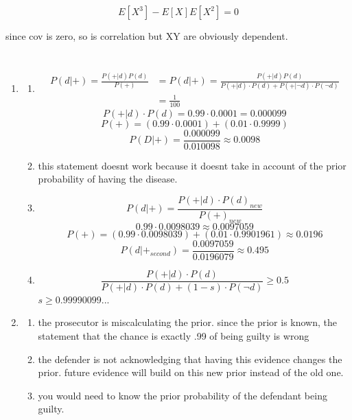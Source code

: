 \documentclass{article}
\begin{document}
\begin{enumerate}
    \begin{equation}
        E[X^3]-E[X]E[X^2]=0
    \end{equation}

    since cov is zero, so is correlation but XY are obviously dependent. 
\end{enumerate}

\section{}
\begin{enumerate}
    \item \begin{enumerate}
        \item \begin{equation}\begin{split}
                P(d|+)=\frac{P(+|d)P(d)}{P(+)} &= 
                P(d|+)=\frac{P(+|d)P(d)}{P(+ | d) \cdot P(d) + P(+ | \neg d) \cdot P(\neg d)} \\
                &=\frac{1}{100}
        \end{split}
        \end{equation}
        $$P(+ | d) \cdot P(d) = 0.99 \cdot 0.0001 = 0.000099$$
        $$P(+) = (0.99 \cdot 0.0001) + (0.01 \cdot 0.9999)$$
        $$P(D | +) = \frac{0.000099}{0.010098}\approx 0.0098$$
        \item this statement doesnt work because it doesnt take in account of the prior probability of having the disease.
        \item $$P(d | +) = \frac{P(+ | d) \cdot P(d)_{new}}{P(+)_{new}}$$
        $$0.99 \cdot 0.0098039 \approx 0.0097059$$
        $$P(+) = (0.99 \cdot 0.0098039) + (0.01 \cdot 0.9901961) \approx 0.0196$$
        $$P(d | +_{second}) = \frac{0.0097059}{0.0196079} \approx 0.495$$
        \item $$\frac{P(+|d) \cdot P(d)}{P(+|d) \cdot P(d) + (1 - s) \cdot P(\neg d)} \ge 0.5$$
        \(s \ge 0.99990099...\)
    \end{enumerate}
    \item \begin{enumerate}
        \item the prosecutor is miscalculating the prior. since the prior is known, the statement that the chance is exactly .99 of being guilty is wrong
        \item the defender is not acknowledging that having this evidence changes the prior. future evidence will build on this new prior instead of the old one. 
        \item you would need to know the prior probability of the defendant being guilty. 
    \end{enumerate}


\end{enumerate}
\end{document}
